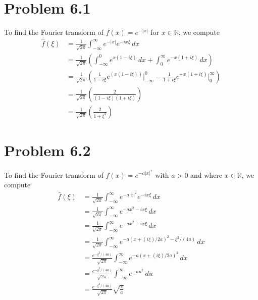\documentclass[12pt]{report}
\begin{document}
\maketitle

\section*{Problem 6.1}
To find the Fourier transform of $f(x) = e^{-|x|}$ for $x \in \mathbb{R}$, we compute
\begin{align*}
  \hat{f}(\xi) &= \frac{1}{\sqrt{2\pi}} \int_{-\infty}^\infty e^{-|x|}e^{-ix\xi} \, dx \\
               &= \frac{1}{\sqrt{2\pi}} \left(\int_{-\infty}^0 e^{x(1 - i\xi)} \, dx + \int_0^\infty e^{-x(1 + i\xi)} \, dx\right) \\
               &= \frac{1}{\sqrt{2\pi}} \left(\frac{1}{1-i\xi} e^{(x(1-i\xi))}\big\vert_{-\infty}^0 - \frac{1}{1 + i\xi} e^{-x(1+i\xi)}\big\vert_0^\infty\right) \\
               &= \frac{1}{\sqrt{2\pi}} \left( \frac{2}{(1-i\xi)(1+i\xi)}\right) \\
               &= \frac{1}{\sqrt{2\pi}} \left( \frac{2}{1+\xi^2}\right)
\end{align*}

\section*{Problem 6.2}
To find the Fourier transform of $f(x) = e^{-a|x|^2}$ with $a > 0$ and where $x \in \mathbb{R}$, we compute
\begin{align*}
  \hat{f}(\xi) &= \frac{1}{\sqrt{2\pi}} \int_{-\infty}^\infty e^{-a|x|^2} e^{-ix\xi} \, dx \\
               &= \frac{1}{\sqrt{2\pi}} \int_{-\infty}^\infty e^{-ax^2 - ix\xi} \, dx \\
               &= \frac{1}{\sqrt{2\pi}} \int_{-\infty}^\infty e^{-ax^2 - ix\xi} \, dx \\
               &= \frac{1}{\sqrt{2\pi}} \int_{-\infty}^\infty e^{-a(x + (i\xi)/2a)^2 - \xi^2/(4a)}\, dx\\
               &= \frac{e^{-\xi^2/(4a)}}{\sqrt{2\pi}} \int_{-\infty}^\infty e^{-a(x + (i\xi)/2a)^2}\, dx \\
               &= \frac{e^{-\xi^2/(4a)}}{\sqrt{2\pi}} \int_{-\infty}^\infty e^{-au^2}\, du \\
               &= \frac{e^{-\xi^2/(4a)}}{\sqrt{2\pi}} \sqrt{\frac{\pi}{a}}
\end{align*}
\end{document}
